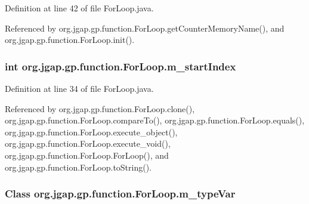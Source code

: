 Definition at line 42 of file For\-Loop.\-java.



Referenced by org.\-jgap.\-gp.\-function.\-For\-Loop.\-get\-Counter\-Memory\-Name(), and org.\-jgap.\-gp.\-function.\-For\-Loop.\-init().

\hypertarget{classorg_1_1jgap_1_1gp_1_1function_1_1_for_loop_a47a1fb231f018111e2822d9cec1c5806}{
\subsubsection[{m\-\_\-start\-Index}]{\setlength{\rightskip}{0pt plus 5cm}int org.\-jgap.\-gp.\-function.\-For\-Loop.\-m\-\_\-start\-Index\hspace{0.3cm}{\ttfamily [private]}}}\label{classorg_1_1jgap_1_1gp_1_1function_1_1_for_loop_a47a1fb231f018111e2822d9cec1c5806}


Definition at line 34 of file For\-Loop.\-java.



Referenced by org.\-jgap.\-gp.\-function.\-For\-Loop.\-clone(), org.\-jgap.\-gp.\-function.\-For\-Loop.\-compare\-To(), org.\-jgap.\-gp.\-function.\-For\-Loop.\-equals(), org.\-jgap.\-gp.\-function.\-For\-Loop.\-execute\-\_\-object(), org.\-jgap.\-gp.\-function.\-For\-Loop.\-execute\-\_\-void(), org.\-jgap.\-gp.\-function.\-For\-Loop.\-For\-Loop(), and org.\-jgap.\-gp.\-function.\-For\-Loop.\-to\-String().

\hypertarget{classorg_1_1jgap_1_1gp_1_1function_1_1_for_loop_abd567d94ca074f3447ad8cc633f12b1b}{
\subsubsection[{m\-\_\-type\-Var}]{\setlength{\rightskip}{0pt plus 5cm}Class org.\-jgap.\-gp.\-function.\-For\-Loop.\-m\-\_\-type\-Var\hspace{0.3cm}{\ttfamily [private]}}}\label{classorg_1_1jgap_1_1gp_1_1function_1_1_for_loop_abd567d94ca074f3447ad8cc633f12b1b}


